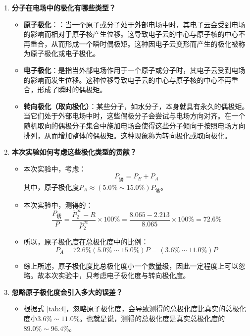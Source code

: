 \documentclass[cn,hazy,pku,12pt,normal,math=newtx,cite=super]{elegantnote}
\begin{document}
\begin{enumerate}
    \item \textbf{分子在电场中的极化有哪些类型？}
    \begin{itemize}
        \item \textbf{原子极化}：：当一个原子或分子处于外部电场中时，其电子云会受到电场的影响而相对于原子核产生位移。这导致电子云的中心与原子核的中心不再重合，从而形成一个瞬时偶极矩。这种因电子云变形而产生的极化被称为原子极化或电子极化。
        \item \textbf{电子极化}：是指当外部电场作用于一个原子或分子时，其电子云受到电场的影响而发生位移。这种位移导致电子云的中心与原子核的中心不再重合，形成了瞬时的偶极矩。
        \item \textbf{转向极化（取向极化）}：某些分子，如水分子，本身就具有永久的偶极矩。当它们处于外部电场中时，这些偶极分子会尝试与电场方向对齐。在一个随机取向的偶极分子集合中施加电场会使得这些分子倾向于按照电场方向排列，从而增加整体的偶极矩。这种现象称为转向极化或取向极化。
    \end{itemize}
    \item \textbf{本次实验如何考虑这些极化类型的贡献？}
    \begin{itemize}
        \item 本次实验中，考虑：
        \begin{equation*}
            P_{\text{诱}} = P_E + P_A
        \end{equation*}
        其中，原子极化度$P_A\approx(5.0\%\sim15.0\%)P_{\text{诱}}$。
        \item 本次实验中，测得的：
        \begin{equation*}
            \frac{P_{\text{诱}}}{P} = \frac{\bar{P}_2^\infty - R}{\bar{P}_2^\infty} \times 100\%= \frac{8.065-2.213}{8.065} \times 100\% = 72.6\%
        \end{equation*}
        \item 所以，原子极化度在总极化度中的比例：
        \begin{equation}\label{eq:6}
            P_A = 72.6\%(5.0\%\sim15.0\%)P = (3.6\%\sim11.0\%)P
        \end{equation}
        \item 综上所述，原子极化度比总极化度小一个数量级，因此一定程度上可以忽略。故本次实验中，只考虑电子极化度与转向极化度。
    \end{itemize}
    \item \textbf{忽略原子极化度会引入多大的误差？}
    \begin{itemize}
        \item 根据式 \eqref{tab:4}，忽略原子极化度，会导致测得的总极化度比真实的总极化度小$3.6\%\sim11.0\%$。也就是说，测得的总极化度是真实总极化度的$89.0\%\sim 96.4\%$。

\end{itemize}
\end{enumerate}
\end{document}
